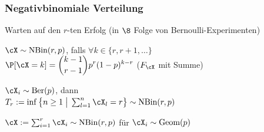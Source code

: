 \subsubsection{Negativbinomiale Verteilung}
{\scriptsize Warten auf den $r$-ten Erfolg (in $\8$ Folge von Bernoulli-Experimenten)}

\shortdefinition $\cX \sim \text{NBin}(r, p)$, falls $\forall k \in \{r, r + 1, \ldots \}$\\
$\displaystyle \P[\cX = k] = {k - 1 \choose r - 1} p^r (1 - p)^{k - r}$ ($F_\cX$ mit Summe)

\shorttheorem $\cX_i \sim \text{Ber}(p)$, dann\\
$T_r := \inf \left\{ n \geq 1\; \big|\; \sum_{l = 1}^{n} \cX_l = r \right\} \sim \text{NBin}(r, p)$

\shortremark $\cX := \sum_{i = 1}^{r} \cX_i \sim \text{NBin}(r, p)$ für $\cX_i \sim \text{Geom}(p)$
